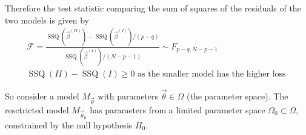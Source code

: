 
Therefore the test statistic comparing the sum of squares of the residuals of the two models is given by
\begin{equation}
    \begin{gathered}
        \mathcal{F} = \frac{\operatorname{SSQ}(\vec{\beta}^{(I I)}) - \operatorname{SSQ}(\vec{\beta}^{(I)}) \slash (p-q)}{\operatorname{SSQ}(\vec{\beta}^{(I)}) \slash (N-p-1)} \sim F_{p-q,N-p-1} \\
        \operatorname{SSQ}(I I) - \operatorname{SSQ}(I) \geq 0 \text { as the smaller model has the higher loss }
    \end{gathered}
\end{equation}


So consider a model $M_\vec{\theta}$ with parameters $\vec{\theta} \in \Omega$ (the parameter space).
The resctricted model $M_{\vec{\theta}_0}$ has parameters from a limited parameter space $\Omega_0 \subset \Omega$,
constrained by the null hypothesis $H_0$.

